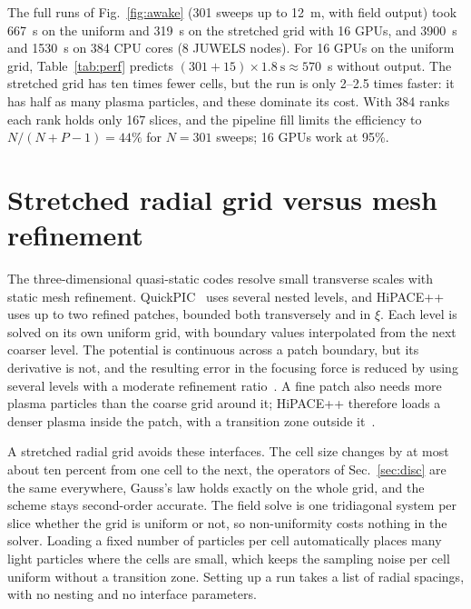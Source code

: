 \documentclass[aps,prab,reprint,floatfix,superscriptaddress,amsmath,amssymb]{revtex4-2}
\begin{document}
The full runs of Fig.~\ref{fig:awake} (301 sweeps up to 12~m, with field output) took 667~s on the uniform and 319~s on the stretched grid with 16 GPUs, and 3900~s and 1530~s on 384 CPU cores (8 JUWELS nodes). For 16 GPUs on the uniform grid, Table~\ref{tab:perf} predicts $(301+15)\times 1.8~\mathrm{s} \approx 570$~s without output. The stretched grid has ten times fewer cells, but the run is only 2--2.5 times faster: it has half as many plasma particles, and these dominate its cost. With 384 ranks each rank holds only 167 slices, and the pipeline fill limits the efficiency to $N/(N+P-1) = 44\%$ for $N = 301$ sweeps; 16 GPUs work at 95\%.

\section{Stretched radial grid versus mesh refinement}\label{sec:mr}

The three-dimensional quasi-static codes resolve small transverse scales with static mesh refinement. QuickPIC~\cite{Su2024} uses several nested levels, and HiPACE++~\cite{HiPACEdoc} uses up to two refined patches, bounded both transversely and in $\xi$. Each level is solved on its own uniform grid, with boundary values interpolated from the next coarser level. The potential is continuous across a patch boundary, but its derivative is not, and the resulting error in the focusing force is reduced by using several levels with a moderate refinement ratio~\cite{Su2024}. A fine patch also needs more plasma particles than the coarse grid around it; HiPACE++ therefore loads a denser plasma inside the patch, with a transition zone outside it~\cite{HiPACEdoc}.

A stretched radial grid avoids these interfaces. The cell size changes by at most about ten percent from one cell to the next, the operators of Sec.~\ref{sec:disc} are the same everywhere, Gauss's law holds exactly on the whole grid, and the scheme stays second-order accurate. The field solve is one tridiagonal system per slice whether the grid is uniform or not, so non-uniformity costs nothing in the solver. Loading a fixed number of particles per cell automatically places many light particles where the cells are small, which keeps the sampling noise per cell uniform without a transition zone. Setting up a run takes a list of radial spacings, with no nesting and no interface parameters.
\end{document}
